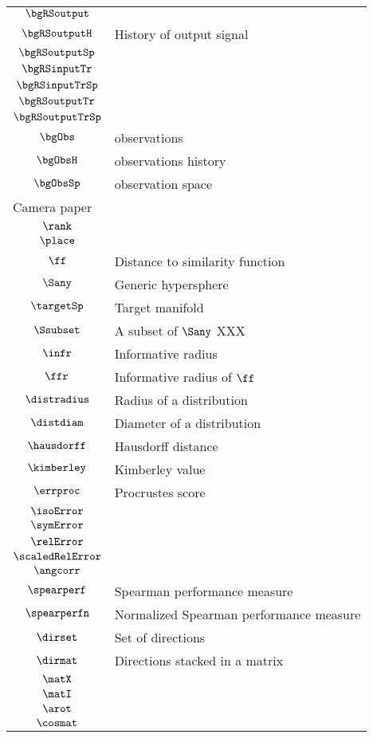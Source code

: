 \begin{longtable}{cl}
 $\bgRSoutput$ & \\ 
 $\bgRSoutputH$ &  History of output signal\\ 
 $\bgRSoutputSp$ &  \\ 
 $\bgRSinputTr$ &  \\ 
 $\bgRSinputTrSp$ &  \\ 
 $\bgRSoutputTr$ &  \\ 
 $\bgRSoutputTrSp$ & \\ 
 $\bgObs$ &  observations\\ 
 $\bgObsH$ &  observations history\\ 
 $\bgObsSp$ &  observation space\\ 
 \multicolumn{2}{l}{Camera paper}\\ 
 \hline
$\rank$ & \\ 
 $\place$ & \\ 
 $\ff$ &  Distance to similarity function\\ 
 $\Sany$ &  Generic hypersphere\\ 
 $\targetSp$ &  Target manifold\\ 
 $\Ssubset$ &  A subset of $\Sany$  XXX\\ 
 $\infr$ &  Informative radius\\ 
 $\ffr$ &  Informative radius of $\ff$\\ 
 $\distradius$ &  Radius of a distribution\\ 
 $\distdiam$ &  Diameter of a distribution\\ 
 $\hausdorff$ &  Hausdorff distance\\ 
 $\kimberley$ &  Kimberley value\\ 
 $\errproc$ &  Procrustes score\\ 
 $\isoError$ & \\ 
 $\symError$ & \\ 
 $\relError$ & \\ 
 $\scaledRelError$ & \\ 
 $\angcorr$ & \\ 
 $\spearperf$ &  Spearman performance measure\\ 
 $\spearperfn$ &  Normalized Spearman performance measure\\ 
 $\dirset$ &  Set of directions\\ 
 $\dirmat$ &  Directions stacked in a matrix\\ 
 $\matX$ & \\ 
 $\matI$ & \\ 
 $\arot$ & \\ 
 $\cosmat$ & \\ 

\end{longtable}
